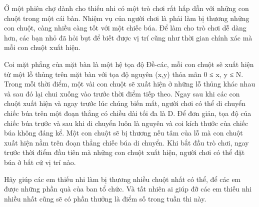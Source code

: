 Ở một phiên chợ dành cho thiếu nhi có một trò chơi rất hấp dẫn với những con chuột trong một cái bàn. Nhiệm vụ của người chơi là phải làm bị thương những con chuột, càng nhiều càng tốt với một chiếc búa. Để làm cho trò chơi dễ dàng hơn, các bạn nhỏ đã hỏi bụt để biết được vị trí cũng như thời gian chính xác mà mỗi con chuột xuất hiện.  

   Coi mặt phẳng của mặt bàn là một hệ tọa độ Đề-các, mỗi con chuột sẽ xuất hiện từ một lỗ thủng trên mặt bàn với tọa độ nguyên (x,y) thỏa mãn 0 ≤ x, y ≤ N. Trong mỗi thời điểm, một vài con chuột sẽ xuất hiện ở những lỗ thủng khác nhau và sau đó lại chui xuống vào trước thời điểm tiếp theo. Ngay sau khi các con chuột xuất hiện và ngay trước lúc chúng biến mất, người chơi có thể di chuyển chiếc búa trên một đoạn thẳng có chiều dài tối đa là D. Để đơn giản, tọa độ của chiếc búa trước và sau khi di chuyển luôn là nguyên và coi kích thước của chiếc búa không đáng kể. Một con chuột sẽ bị thương nếu tâm của lỗ mà con chuột xuất hiện nằm trên đoạn thẳng chiếc búa di chuyển. Khi bắt đầu trò chơi, ngay trước thời điểm đầu tiên mà những con chuột xuất hiện, người chơi có thể đặt búa ở bất cứ vị trí nào.  

   Hãy giúp các em thiếu nhi làm bị thương nhiều chuột nhất có thể, để các em được những phần quà của ban tổ chức. Và tất nhiên ai giúp đỡ các em thiếu nhi nhiều nhất cũng sẽ có phần thưởng là điểm số trong tuần thi này.  

\